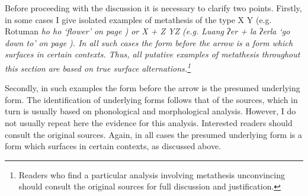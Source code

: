 Before proceeding with the discussion
it is necessary to clarify two points.
Firstly, in some cases I give isolated examples of metathesis
of the type X {\ra} Y
(e.g. Rotuman \it{ho} {\ra} \it{ho}
`flower' on page \pageref{ex:VCV->VVC})
or X + Z {\ra} YZ (e.g. Luang \it{ʔer} + \it{la}
{\ra} \it{ʔerla} `go down to' on page \pageref{ex:LuaMet}).
In all such cases the form before the arrow is
a form which surfaces in certain contexts.
Thus, all putative examples of metathesis throughout this section
are based on true surface alternations.\footnote{
		Readers who find a particular analysis involving metathesis
		unconvincing should consult the original sources for full
		discussion and justification.}

Secondly, in such examples the form
before the arrow is the presumed underlying form.
The identification of underlying forms follows that of the sources,
which in turn is usually based on phonological and morphological analysis.
However, I do not usually repeat here the evidence for this analysis.
Interested readers should consult the original sources.
Again, in all cases the presumed underlying form
is a form which surfaces in certain contexts, as discussed above.